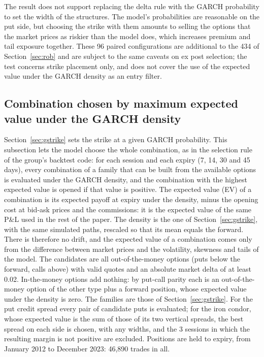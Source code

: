 \documentclass[11pt,a4paper]{article}
\begin{document}
The result does not support replacing the delta rule with the GARCH probability to set the width of the structures. The model's probabilities are reasonable on the put side, but choosing the strike with them amounts to selling the options that the market prices as riskier than the model does, which increases premium and tail exposure together. These 96 paired configurations are additional to the 434 of Section~\ref{sec:rob} and are subject to the same caveats on ex post selection; the test concerns strike placement only, and does not cover the use of the expected value under the GARCH density as an entry filter.

\subsection{Combination chosen by maximum expected value under the GARCH density}\label{sec:gev}

Section~\ref{sec:gstrike} sets the strike at a given GARCH probability. This subsection lets the model choose the whole combination, as in the selection rule of the group's backtest code: for each session and each expiry (7, 14, 30 and 45 days), every combination of a family that can be built from the available options is evaluated under the GARCH density, and the combination with the highest expected value is opened if that value is positive. The expected value (EV) of a combination is its expected payoff at expiry under the density, minus the opening cost at bid-ask prices and the commissions: it is the expected value of the same P\&L used in the rest of the paper. The density is the one of Section~\ref{sec:gstrike}, with the same simulated paths, rescaled so that its mean equals the forward. There is therefore no drift, and the expected value of a combination comes only from the difference between market prices and the volatility, skewness and tails of the model. The candidates are all out-of-the-money options (puts below the forward, calls above) with valid quotes and an absolute market delta of at least 0.02. In-the-money options add nothing: by put-call parity each is an out-of-the-money option of the other type plus a forward position, whose expected value under the density is zero. The families are those of Section~\ref{sec:gstrike}. For the put credit spread every pair of candidate puts is evaluated; for the iron condor, whose expected value is the sum of those of its two vertical spreads, the best spread on each side is chosen, with any widths, and the 3 sessions in which the resulting margin is not positive are excluded. Positions are held to expiry, from January 2012 to December 2023: 46,890 trades in all.
\end{document}
